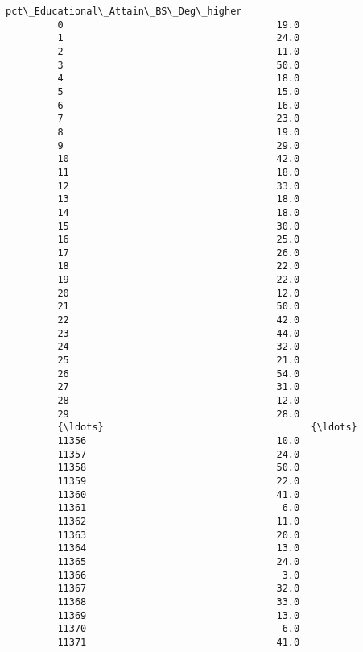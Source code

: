 \documentclass[11pt]{article}
\begin{document}
\begin{Verbatim}[commandchars=\\\{\}]
               pct\_Educational\_Attain\_BS\_Deg\_higher  
         0                                     19.0  
         1                                     24.0  
         2                                     11.0  
         3                                     50.0  
         4                                     18.0  
         5                                     15.0  
         6                                     16.0  
         7                                     23.0  
         8                                     19.0  
         9                                     29.0  
         10                                    42.0  
         11                                    18.0  
         12                                    33.0  
         13                                    18.0  
         14                                    18.0  
         15                                    30.0  
         16                                    25.0  
         17                                    26.0  
         18                                    22.0  
         19                                    22.0  
         20                                    12.0  
         21                                    50.0  
         22                                    42.0  
         23                                    44.0  
         24                                    32.0  
         25                                    21.0  
         26                                    54.0  
         27                                    31.0  
         28                                    12.0  
         29                                    28.0  
         {\ldots}                                    {\ldots}  
         11356                                 10.0  
         11357                                 24.0  
         11358                                 50.0  
         11359                                 22.0  
         11360                                 41.0  
         11361                                  6.0  
         11362                                 11.0  
         11363                                 20.0  
         11364                                 13.0  
         11365                                 24.0  
         11366                                  3.0  
         11367                                 32.0  
         11368                                 33.0  
         11369                                 13.0  
         11370                                  6.0  
         11371                                 41.0  

\end{Verbatim}
\end{document}

